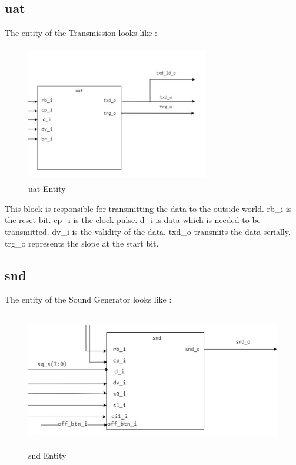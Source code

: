 \documentclass[12pt,a4paper]{article}
\begin{document}
\subsection{uat}
The entity of the Transmission looks like :\\

\begin{figure}[H]
\centering
\includegraphics[width=8cm,height=6cm]{uat_ss.jpg}
\caption{uat Entity}
\label{uat Entity}
\end{figure}

This block is responsible for transmitting the data to the outside world.  rb\_i is the reset bit. cp\_i is the clock pulse. d\_i is data which is needed to be transmitted. dv\_i is the validity of the data. txd\_o transmits the data serially. trg\_o represents the slope at the start bit. 

\subsection{snd}
The entity of the Sound Generator looks like :\\

\begin{figure}[H]
\centering
\includegraphics[width=12cm,height=6cm]{newsnd_ss.jpg}
\caption{snd Entity}
\label{snd Entity}
\end{figure}
\end{document}
